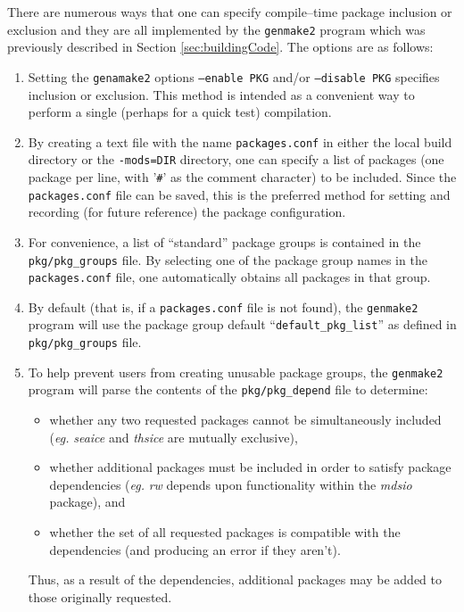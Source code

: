 There are numerous ways that one can specify compile--time package
inclusion or exclusion and they are all implemented by the
\texttt{genmake2} program which was previously described in Section
\ref{sec:buildingCode}.  The options are as follows:
\begin{enumerate}
\item Setting the \texttt{genamake2} options \texttt{--enable PKG}
  and/or \texttt{--disable PKG} specifies inclusion or exclusion.
  This method is intended as a convenient way to perform a single
  (perhaps for a quick test) compilation.
  
\item By creating a text file with the name \texttt{packages.conf} in
  either the local build directory or the \texttt{-mods=DIR}
  directory, one can specify a list of packages (one package per line,
  with '\texttt{\#}' as the comment character) to be included.  Since
  the \texttt{packages.conf} file can be saved, this is the preferred
  method for setting and recording (for future reference) the package
  configuration.
  
\item For convenience, a list of ``standard'' package groups is
  contained in the \texttt{pkg/pkg\_groups} file.  By selecting one of
  the package group names in the \texttt{packages.conf} file, one
  automatically obtains all packages in that group.

\item By default (that is, if a \texttt{packages.conf} file is not
  found), the \texttt{genmake2} program will use the
  package group default ``\texttt{default\_pkg\_list}'' as defined 
  in \texttt{pkg/pkg\_groups} file.

\item To help prevent users from creating unusable package groups, the
  \texttt{genmake2} program will parse the contents of the
  \texttt{pkg/pkg\_depend} file to determine:
  \begin{itemize}
  \item whether any two requested packages cannot be simultaneously
    included (\textit{eg.} \textit{seaice} and \textit{thsice} are
    mutually exclusive),
  \item whether additional packages must be included in order to
    satisfy package dependencies (\textit{eg.} \textit{rw} depends
    upon functionality within the \textit{mdsio} package), and
  \item whether the set of all requested packages is compatible with
    the dependencies (and producing an error if they aren't).
  \end{itemize}
  Thus, as a result of the dependencies, additional packages may be
  added to those originally requested.

\end{enumerate}


